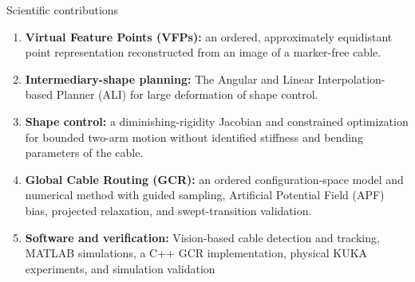 \documentclass[aspectratio=169,10pt]{beamer}
\begin{document}
\begin{frame}[t]{Scientific contributions}
  \footnotesize
  \begin{enumerate}
    \setlength{\itemsep}{0.015cm}
    \item \textbf{Virtual Feature Points (VFPs):} an ordered, approximately
      equidistant point representation reconstructed from an image of a marker-free cable.

    \item \textbf{Intermediary-shape planning:} The Angular and Linear Interpolation-based Planner (ALI) for large deformation of shape control.

    \item \textbf{Shape control:} a diminishing-rigidity Jacobian and
      constrained optimization for bounded two-arm motion without identified
      stiffness and bending parameters of the cable.

    \item \textbf{Global Cable Routing (GCR):} an ordered configuration-space
      model and numerical method with guided sampling, Artificial Potential
      Field (APF) bias, projected relaxation, and swept-transition validation.

    \item \textbf{Software and verification:} Vision-based cable detection and tracking, MATLAB simulations, a C++ GCR implementation, physical KUKA experiments, and simulation validation
  \end{enumerate}


\end{frame}
\end{document}
